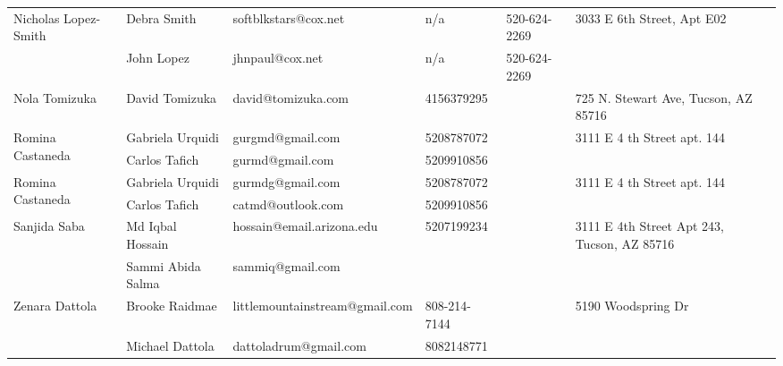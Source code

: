 \documentclass[landscape]{article}\usepackage[]{graphicx}\usepackage[]{color}
\begin{document}
\begin{longtable}{|p{100pt}|p{100pt}|p{140pt}|p{60pt}|p{64pt}|p{120pt}|}
 &  &  &  &  & \\
\hline
\multirow{2}{100pt}{Nicholas Lopez-Smith} & Debra Smith & softblkstars@cox.net & n/a & 520-624-2269 & \multirow{2}{120pt}{3033 E 6th Street, Apt E02} \\
 & John Lopez & jhnpaul@cox.net & n/a & 520-624-2269 & \\
\hline
\multirow{2}{100pt}{Nola Tomizuka} & David Tomizuka & david@tomizuka.com & 4156379295 &  & \multirow{2}{120pt}{725 N. Stewart Ave, Tucson, AZ 85716} \\
 &  &  &  &  & \\
\hline
\multirow{2}{100pt}{Romina Castaneda} & Gabriela Urquidi & gurgmd@gmail.com & 5208787072 &  & \multirow{2}{120pt}{3111 E 4 th Street apt. 144} \\
 & Carlos Tafich & gurmd@gmail.com & 5209910856 &  & \\
\hline
\multirow{2}{100pt}{Romina Castaneda} & Gabriela Urquidi & gurmdg@gmail.com & 5208787072 &  & \multirow{2}{120pt}{3111 E 4 th Street apt. 144} \\
 & Carlos Tafich & catmd@outlook.com & 5209910856 &  & \\
\hline
\multirow{2}{100pt}{Sanjida Saba} & Md Iqbal Hossain & hossain@email.arizona.edu & 5207199234 &  & \multirow{2}{120pt}{3111 E 4th Street Apt 243, Tucson, AZ 85716} \\
 & Sammi Abida Salma & sammiq@gmail.com &  &  & \\
\hline
\multirow{2}{100pt}{Zenara Dattola} & Brooke Raidmae & littlemountainstream@gmail.com & 808-214-7144 &  & \multirow{2}{120pt}{5190 Woodspring Dr} \\
 & Michael Dattola & dattoladrum@gmail.com & 8082148771 &  & \\
\hline
\end{longtable}
\newpage
\end{document}
